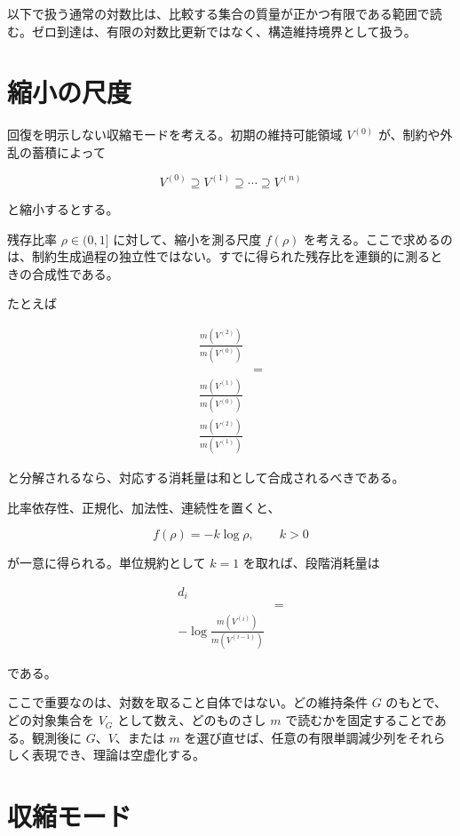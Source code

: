 \documentclass[12pt,a4paper]{article}
\begin{document}
以下で扱う通常の対数比は、比較する集合の質量が正かつ有限である範囲で読む。ゼロ到達は、有限の対数比更新ではなく、構造維持境界として扱う。

\section{縮小の尺度}\label{ux7e2eux5c0fux306eux5c3aux5ea6}

回復を明示しない収縮モードを考える。初期の維持可能領域 \(V^{(0)}\) が、制約や外乱の蓄積によって

\[
V^{(0)}\supseteq V^{(1)}\supseteq\cdots\supseteq V^{(n)}
\]

と縮小するとする。

残存比率 \(\rho\in(0,1]\) に対して、縮小を測る尺度 \(f(\rho)\) を考える。ここで求めるのは、制約生成過程の独立性ではない。すでに得られた残存比を連鎖的に測るときの合成性である。

たとえば

\[
\begin{aligned}
\frac{m(V^{(2)})}{m(V^{(0)})} \\
&= \\
\frac{m(V^{(1)})}{m(V^{(0)})} \\
\frac{m(V^{(2)})}{m(V^{(1)})}
\end{aligned}
\]

と分解されるなら、対応する消耗量は和として合成されるべきである。

比率依存性、正規化、加法性、連続性を置くと、

\[
f(\rho)=-k\log \rho,\qquad k>0
\]

が一意に得られる。単位規約として \(k=1\) を取れば、段階消耗量は

\[
\begin{aligned}
d_{i} \\
&= \\
-\log\frac{m(V^{(i)})}{m(V^{(i-1)})}
\end{aligned}
\]

である。

ここで重要なのは、対数を取ること自体ではない。どの維持条件 \(G\) のもとで、どの対象集合を \(V_{G}\) として数え、どのものさし \(m\) で読むかを固定することである。観測後に \(G\)、\(V\)、または \(m\) を選び直せば、任意の有限単調減少列をそれらしく表現でき、理論は空虚化する。

\section{収縮モード}\label{ux53ceux7e2eux30e2ux30fcux30c9}
\end{document}
